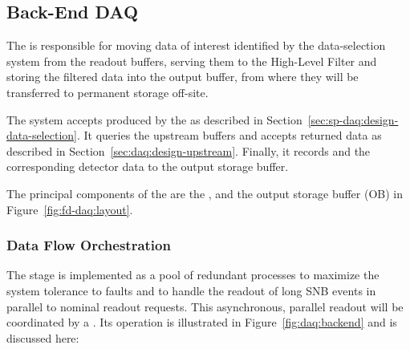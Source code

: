 \subsection{Back-End DAQ}
\label{sec:fd-daq:design-backend}

The   is responsible for moving data of interest identified by the data-selection system from the readout  buffers, serving them to the High-Level Filter and storing the filtered data into the output buffer, from where they will be transferred to permanent storage off-site.

The  system accepts  produced by the  as described
in Section~\ref{sec:sp-daq:design-data-selection}.  It queries the upstream  buffers and
accepts returned data as described in Section~\ref{sec:daq:design-upstream}. Finally, it records
 and the corresponding detector data to the output storage buffer.

The principal components of the  are the ,  and the output
storage buffer (OB) in Figure~\ref{fig:fd-daq:layout}.


\subsubsection{Data Flow Orchestration}

The  stage is implemented as a pool of redundant  processes to maximize the system tolerance to faults and to handle the readout of long SNB events in parallel to nominal readout requests. This asynchronous, parallel readout will be coordinated by a .  Its operation is illustrated in Figure~\ref{fig:daq:backend} and is discussed here:


